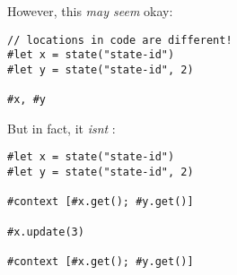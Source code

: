 \pandocbounded{}

However, this \emph{may seem} okay:

\begin{verbatim}
// locations in code are different!
#let x = state("state-id")
#let y = state("state-id", 2)

#x, #y
\end{verbatim}

\pandocbounded{}

But in fact, it \emph{isn\textquotesingle t} :

\begin{verbatim}
#let x = state("state-id")
#let y = state("state-id", 2)

#context [#x.get(); #y.get()]

#x.update(3)

#context [#x.get(); #y.get()]
\end{verbatim}

\pandocbounded{}

